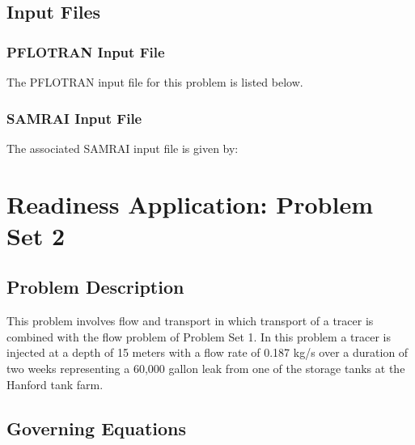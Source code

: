 \documentclass[12pt]{article}
\begin{document}
\subsection{Input Files}

\subsubsection{PFLOTRAN Input File}

The PFLOTRAN input file for this problem is listed below.

\tiny

\normalsize

\subsubsection{SAMRAI Input File}

The associated SAMRAI input file is given by:

\tiny

\normalsize

\section{Readiness Application: Problem Set 2}

\subsection{Problem Description}

This problem involves flow and transport in which transport of a tracer is combined with the flow problem of Problem Set 1. In this problem a tracer is injected at a depth of 15 meters with a flow rate of 0.187 kg/s over a duration of two weeks representing a 60,000 gallon leak from one of the storage tanks at the Hanford tank farm.

\subsection{Governing Equations}
\end{document}
